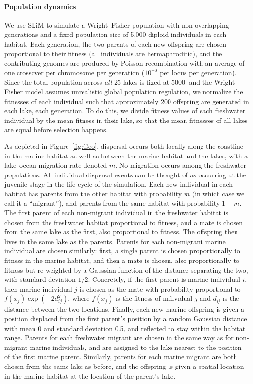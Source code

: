 \documentclass{article}
\begin{document}
\paragraph{Population dynamics}

We use SLiM to simulate a Wright--Fisher population with non-overlapping generations and a fixed population size of 5,000 diploid individuals in each habitat. 
Each generation, the two parents of each new offspring are chosen proportional to their fitness (all individuals are hermaphroditic), and the contributing genomes are produced by Poisson recombination with an average of one crossover per chromosome per generation ($10^{-8}$ per locus per generation). 
Since the total population across \emph{all} 25 lakes is fixed at 5000, and the Wright--Fisher model assumes unrealistic global population regulation, we normalize the fitnesses of each individual such that approximately 200 offspring are generated in each lake, each generation. To do this, we divide fitness values of each freshwater individual by the mean fitness in their lake, so that the mean fitnesses of all lakes are equal before selection happens.

As depicted in Figure~\ref{fig:Geo}, dispersal occurs both locally along the coastline in the marine habitat as well as between the marine habitat and the lakes,
with a lake--ocean migration rate denoted $m$. No migration occurs among the freshwater populations. All individual dispersal events can be thought of as occurring at the juvenile stage in the life cycle of the simulation. 
Each new individual in each habitat has parents from the other habitat with probability $m$ (in which case we call it a ``migrant''), and parents from the same habitat with probability $1-m$.
The first parent of each non-migrant individual in the freshwater habitat is chosen from the freshwater habitat proportional to fitness, and a mate is chosen from the same lake as the first, also proportional to fitness. The offspring then lives in the same lake as the parents. Parents for each non-migrant marine individual are chosen similarly:
first, a single parent is chosen proportionally to fitness in the marine habitat, and then a mate is chosen, also proportionally to fitness but re-weighted by a Gaussian function of the distance separating the two, with standard deviation $1/2$. Concretely, if the first parent is marine individual $i$, then marine individual $j$ is chosen as the mate with probability proportional to $f(x_j) \exp(-2d_{ij}^2)$, where $f(x_j)$ is the fitness of individual $j$ and $d_{ij}$ is the distance between the two locations. 
Finally, each new marine offspring is given a position displaced from the first parent's position by a random Gaussian distance with mean 0 and standard deviation 0.5, and reflected to stay within the habitat range.
Parents for each freshwater migrant are chosen in the same way as for non-migrant marine individuals, and are assigned to the lake nearest to the position of the first marine parent. Similarly, parents for each marine migrant are both chosen from the same lake as before, and the offspring is given a spatial location in the marine habitat at the location of the parent's lake. 
\end{document}
